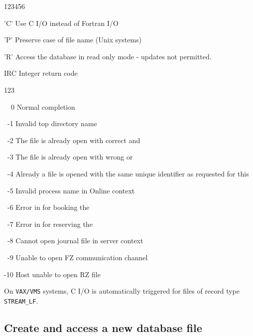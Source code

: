 \begin{DLtt}{123456}
\begin{DLtt}{12}
    \item['C']Use C I/O instead of Fortran I/O
    \item['P']Preserve case of file name (Unix systems)
    \item['R']Access the database in read only mode - updates not permitted.
  \end{DLtt}
\item[IRC]Integer return code
  \begin{DLtt}{123}
    \item[\ \ 0]Normal completion
    \item[\ -1]Invalid top directory name
    \item[\ -2]The file is already open with correct  and 
    \item[\ -3]The file is already open with wrong  or 
    \item[\ -4]Already a file is opened with the same unique
      identifier as requested for this 
    \item[\ -5]Invalid process name in Online context
    \item[\ -6]Error in  for booking the 
    \item[\ -7]Error in  for reserving the 
    \item[\ -8]Cannot open journal file in server context
    \item[\ -9]Unable to open FZ communication channel
    \item[-10]Host unable to open RZ file
  \end{DLtt}
\end{DLtt}

On {\tt VAX/VMS} systems, C I/O is automatically triggered for
files of record type {\tt STREAM\_LF}.

\subsection{Create and access a new database file}


